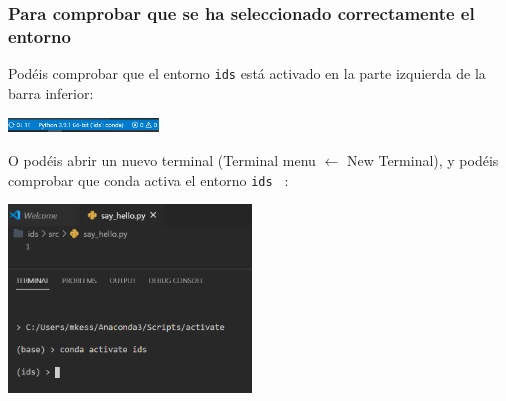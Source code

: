 \documentclass[9pt]{beamer}
\begin{document}
\begin{frame}
  \frametitle{Para comprobar que se ha seleccionado correctamente el entorno}
  Podéis comprobar que el entorno {\tt ids} está activado en la parte
  izquierda de la barra inferior:
  \begin{center}
      \includegraphics[width=4cm]{check_interpreter_01}
  \end{center}\pause
  O podéis abrir un nuevo  terminal  (Terminal menu $\leftarrow$ New
  Terminal), y podéis comprobar que conda activa el entorno {\tt ids } :
  \begin{center}
      \includegraphics[height=5cm]{check_interpreter_02}
  \end{center}	
\end{frame}
\end{document}
